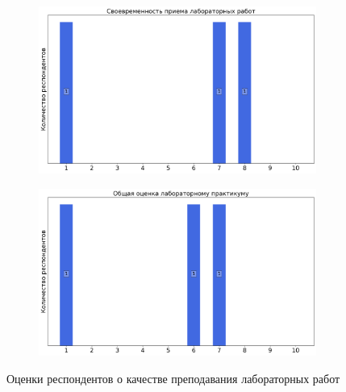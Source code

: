 \begin{figure}[H]
\begin{subfigure}[b]{0.45\textwidth}
				\includegraphics[width=\textwidth]{images/2 course/Радиотехнические цепи и сигналы/labniks-marks-Арумов Г.П.-2.png}
			\end{subfigure}
			\begin{subfigure}[b]{0.45\textwidth}
				\centering
				\includegraphics[width=\textwidth]{images/2 course/Радиотехнические цепи и сигналы/labniks-marks-Арумов Г.П.-3.png}
			\end{subfigure}	
			\caption{Оценки респондентов о качестве преподавания лабораторных работ}
		\end{figure}


